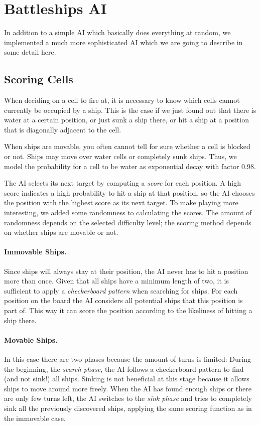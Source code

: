 \documentclass[a4paper]{easychair}
\begin{document}
\section{Battleships AI}
\label{sect:battleships-ai}
In addition to a simple AI which basically does everything at random, we implemented a much more sophisticated AI which we are going to describe in some detail here.

\subsection{Scoring Cells}
When deciding on a cell to fire at, it is necessary to know which cells cannot currently be occupied by a ship. This is the case if we just found out that there is water at a certain position, or just sunk a ship there, or hit a ship at a position that is diagonally adjacent to the cell. 

When ships are movable, you often cannot tell for sure whether a cell is blocked or not. Ships may move over water cells or completely sunk ships. Thus, we model the probability for a cell to be water as exponential decay with factor 0.98.

The AI selects its next target by computing a \emph{score} for each position. A high score indicates a high probability to hit a ship at that position, so the AI chooses the position with the highest score as its next target. To make playing more interesting, we added some randomness to calculating the scores. The amount of randomness depends on the selected difficulty level; the scoring method depends on whether ships are movable or not.

\paragraph{Immovable Ships.} Since ships will always stay at their position, the AI never has to hit a position more than once. Given that all ships have a minimum length of two, it is sufficient to apply a \emph{checkerboard pattern} when searching for ships. For each position on the board the AI considers all potential ships that this position is part of. This way it can score the position according to the likeliness of hitting a ship there.

\paragraph{Movable Ships.} In this case there are two phases because the amount of turns is limited: During the beginning, the \emph{search phase}, the AI follows a checkerboard pattern to find (and not sink!) all ships. Sinking is not beneficial at this stage because it allows ships to move around more freely. When the AI has found enough ships or there are only few turns left, the AI switches to the \emph{sink phase} and tries to completely sink all the previously discovered ships, applying the same scoring function as in the immovable case.
\end{document}
